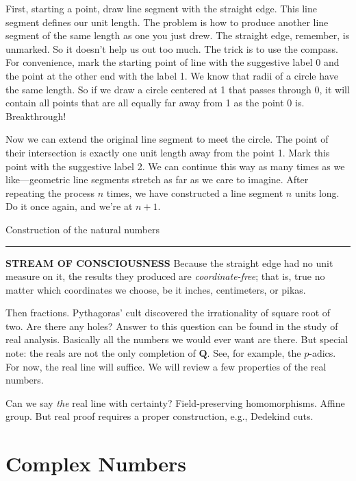 First, starting a point, draw line segment with the straight edge. This line segment defines our unit length. The problem is how to produce another line segment of the same length as one you just drew. The straight edge, remember, is unmarked. So it doesn't help us out too much. The trick is to use the compass. For convenience, mark the starting point of line with the suggestive label \textsf{0} and the point at the other end with the label \textsf{1}. We know that radii of a circle have the same length. So if we draw a circle centered at \textsf{1} that passes through \textsf{0}, it will contain all points that are all equally far away from \textsf{1} as the point \textsf{0} is. Breakthrough!

Now we can extend the original line segment to meet the circle. The point of their intersection is exactly one unit length away from the point \textsf{1}. Mark this point with the suggestive label \textsf{2}. We can continue this way as many times as we like---geometric line segments stretch as far as we care to imagine. After repeating the process $n$ times, we have constructed a line segment $n$ units long. Do it once again, and we're at $n+1$.

\begin{marginfigure}
  
  \caption{\label{fig:mb-natural-numbers-construction} Construction of the natural numbers}
\end{marginfigure}

\hrule

\textbf{STREAM OF CONSCIOUSNESS} Because the straight edge had no unit measure on it, the results they produced are \emph{coordinate-free}; that is, true no matter which coordinates we choose, be it inches, centimeters, or pikas.

Then fractions. Pythagoras' cult discovered the irrationality of square root of two. Are there any holes? Answer to this question can be found in the study of real analysis. Basically all the numbers we would ever want are there. But special note: the reals are not the only completion of $\mathbf{Q}$. See, for example, the $p$-adics. For now, the real line will suffice.  We will review a few properties of the real numbers.

Can we say \emph{the} real line with certainty? Field-preserving homomorphisms. Affine group. But real proof requires a proper construction, e.g., Dedekind cuts.


\section{Complex Numbers}

